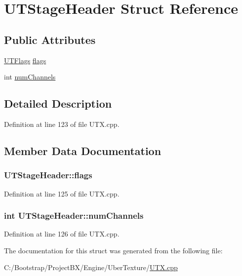 \hypertarget{struct_u_t_stage_header}{
\section{UTStageHeader Struct Reference}
\label{struct_u_t_stage_header}
}
\subsection*{Public Attributes}
\begin{CompactItemize}
\item 
\hyperlink{_u_t_x_8h_27fe6e33ffe813fb674e2a97982670dd}{UTFlags} \hyperlink{struct_u_t_stage_header_6ec40356de5e65aebfbb3e930468ae75}{flags}
\item 
int \hyperlink{struct_u_t_stage_header_eb362c9a89b4f68486acc7e179fdde40}{numChannels}
\end{CompactItemize}


\subsection{Detailed Description}


Definition at line 123 of file UTX.cpp.

\subsection{Member Data Documentation}
\hypertarget{struct_u_t_stage_header_6ec40356de5e65aebfbb3e930468ae75}{
\subsubsection[{flags}]{ {\bf UTStageHeader::flags}}}
\label{struct_u_t_stage_header_6ec40356de5e65aebfbb3e930468ae75}




Definition at line 125 of file UTX.cpp.\hypertarget{struct_u_t_stage_header_eb362c9a89b4f68486acc7e179fdde40}{
\subsubsection[{numChannels}]{\setlength{\rightskip}{0pt plus 5cm}int {\bf UTStageHeader::numChannels}}}
\label{struct_u_t_stage_header_eb362c9a89b4f68486acc7e179fdde40}




Definition at line 126 of file UTX.cpp.

The documentation for this struct was generated from the following file:\begin{CompactItemize}
\item 
C:/Bootstrap/ProjectBX/Engine/UberTexture/\hyperlink{_u_t_x_8cpp}{UTX.cpp}\end{CompactItemize}
